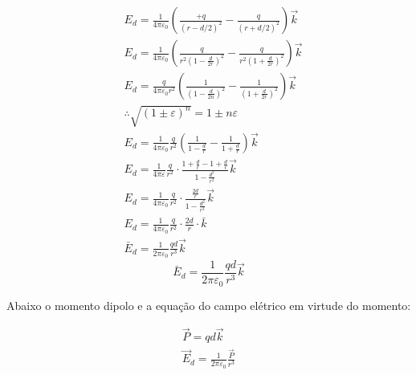 \documentclass[11pt]{article}
\theoremstyle{definition}
\begin{document}
\begin{align*}
    &E_d=\frac{1}{4 \pi \varepsilon_0}\left(\frac{+q}{(r-d / 2)^2}-\frac{q}{(r+d / 2)^2}\right) \vec{k} \\
    &E_d=\frac{1}{4 \pi \varepsilon_0}\left(\frac{q}{r^2\left(1-\frac{d}{2 r}\right)^2}-\frac{q}{r^2\left(1+\frac{d}{2 r}\right)^2}\right) \vec{k}  \\
    &E_d=\frac{q}{4 \pi \varepsilon_0 r^2}\left(\frac{1}{\left(1-\frac{d}{2 n}\right)^2}-\frac{1}{\left(1+\frac{d}{2 r}\right)^2}\right) \vec{k} \\
    &\therefore   \sqrt{(1 \pm \varepsilon)^n}=1 \pm n \varepsilon \\
    &E_d=\frac{1}{4 \pi \varepsilon_0} \frac{q}{r^2}\left(\frac{1}{1-\frac{d}{r}}-\frac{1}{1+\frac{d}{r}}\right) \vec{k} \ \\
    &E_d=\frac{1}{4 \pi \varepsilon} \frac{q}{r^2} \cdot \frac{1+\frac{d}{r}-1+\frac{d}{r}}{1-\frac{d^2}{r^2}} \vec{k} \\
    &E_d=\frac{1}{4 \pi \varepsilon_0} \frac{q}{r^2} \cdot \frac{\frac{2 d}{r}}{1-\frac{d^2}{r^2}} \vec{k}  \\
    &E_d=\frac{1}{4 \pi \varepsilon_0} \frac{q}{r^2} \cdot \frac{2 d}{r} \cdot \bar{k}  \\
    &\bar{E}_d=\frac{1}{2 \pi \varepsilon_0} \frac{q d}{r^3} \vec{k} 
\end{align*} 
\begin{equation}
    \bar{E}_d=\frac{1}{2 \pi \varepsilon_0} \frac{q d}{r^3} \vec{k}
\end{equation}
\begin{text}
    Abaixo o momento dipolo e a equação do campo elétrico em virtude do momento:
\end{text}
\begin{eqnarray}
    \vec{P}=q d \vec{k}  \\
    \vec{E}_d=\frac{1}{2 \pi \varepsilon_0} \frac{\vec{P}}{r^3} 
\end{eqnarray}
    
\end{document}
